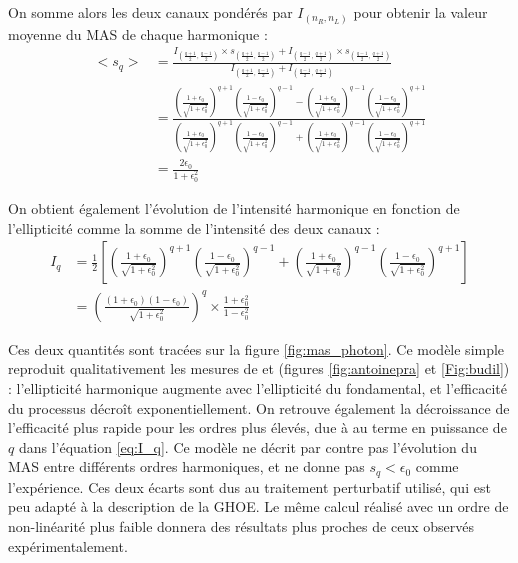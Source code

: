 On somme alors les deux canaux pondérés par $I_{(n_R,n_L)}$ pour obtenir la valeur moyenne du MAS de chaque harmonique :
\begin{align}
<s_q> &= \frac{I_{(\frac{q+1}{2},\frac{q-1}{2})}\times s_{(\frac{q+1}{2},\frac{q-1}{2})}+I_{(\frac{q-1}{2},\frac{q+1}{2})} \times s_{(\frac{q-1}{2},\frac{q+1}{2})}}{I_{(\frac{q+1}{2},\frac{q-1}{2})}+I_{(\frac{q-1}{2},\frac{q+1}{2})}}\nonumber\\
&= \frac{\left(\frac{1+\epsilon_0}{\sqrt{1+\epsilon_0^2}}\right)^{q+1}\left(\frac{1-\epsilon_0}{\sqrt{1+\epsilon_0^2}}\right)^{q-1}
-
\left(\frac{1+\epsilon_0}{\sqrt{1+\epsilon_0^2}}\right)^{q-1}\left(\frac{1-\epsilon_0}{\sqrt{1+\epsilon_0^2}}\right)^{q+1}
}{
\left(\frac{1+\epsilon_0}{\sqrt{1+\epsilon_0^2}}\right)^{q+1}\left(\frac{1-\epsilon_0}{\sqrt{1+\epsilon_0^2}}\right)^{q-1}
+
\left(\frac{1+\epsilon_0}{\sqrt{1+\epsilon_0^2}}\right)^{q-1}\left(\frac{1-\epsilon_0}{\sqrt{1+\epsilon_0^2}}\right)^{q+1}
}\nonumber\\
&= \frac{2\epsilon_0}{1+\epsilon_0^2}
\label{eq:mas_q}
\end{align}

On obtient également l'évolution de l'intensité harmonique en fonction de l'ellipticité comme la somme de l'intensité des deux canaux :
\begin{align}
I_q &= \frac{1}{2}\left[\left(\frac{1+\epsilon_0}{\sqrt{1+\epsilon_0^2}}\right)^{q+1}\left(\frac{1-\epsilon_0}{\sqrt{1+\epsilon_0^2}}\right)^{q-1}+\left(\frac{1+\epsilon_0}{\sqrt{1+\epsilon_0^2}}\right)^{q-1}\left(\frac{1-\epsilon_0}{\sqrt{1+\epsilon_0^2}}\right)^{q+1}\right]\nonumber\\
&= \left(\frac{(1+\epsilon_0)(1-\epsilon_0)}{\sqrt{1+\epsilon_0^2}}\right)^{q}\times\frac{1+\epsilon_0^2}{1-\epsilon_0^2}
\label{eq:I_q}
\end{align}

Ces deux quantités sont tracées sur la figure \ref{fig:mas_photon}. Ce modèle simple reproduit qualitativement les mesures de  et  (figures \ref{fig:antoinepra} et \ref{Fig:budil}) : l'ellipticité harmonique augmente avec l'ellipticité du fondamental, et l'efficacité du processus décroît exponentiellement. On retrouve également la décroissance de l'efficacité plus rapide pour les ordres plus élevés, due à au terme en puissance de $q$ dans l'équation \ref{eq:I_q}. Ce modèle ne décrit par contre pas l'évolution du MAS entre différents ordres harmoniques, et ne donne pas $s_q<\epsilon_0$ comme l'expérience. Ces deux écarts sont dus au traitement perturbatif utilisé, qui est peu adapté à la description de la GHOE. Le même calcul réalisé avec un ordre de non-linéarité plus faible donnera des résultats plus proches de ceux observés expérimentalement.

